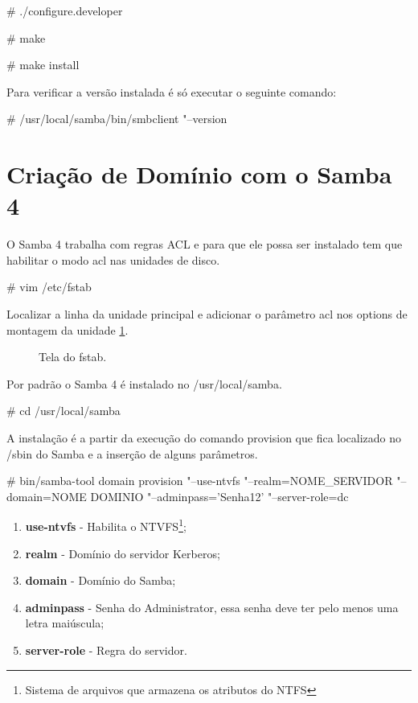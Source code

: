 \# ./configure.developer

\# make 

\# make install

Para verificar a versão instalada é só executar o seguinte comando:

\# /usr/local/samba/bin/smbclient "--version


\section{Criação de Domínio com o Samba 4}

O Samba 4 trabalha com regras ACL e para que ele possa ser instalado tem que habilitar o modo acl nas unidades de disco.

\# vim /etc/fstab

Localizar a linha da unidade principal e adicionar o parâmetro acl nos options de montagem da unidade \ref{fstab}.

\begin{figure}[ht]
   	\centering
   	\caption{Tela do fstab.}
    \label{fstab}
\end{figure}

Por padrão o Samba 4 é instalado no /usr/local/samba.

\# cd /usr/local/samba

A instalação é a partir da execução do comando provision que fica localizado no /sbin do Samba e a inserção de alguns parâmetros.

\noindent \# bin/samba-tool domain provision "--use-ntvfs "--realm=NOME\_SERVIDOR "--domain=NOME DOMINIO  "--adminpass='Senha12' "--server-role=dc

\begin{enumerate}
	\item \textbf{use-ntvfs} - Habilita o NTVFS\footnote[3]{Sistema de arquivos que armazena os atributos do NTFS};
	\item \textbf{realm} - Domínio do servidor Kerberos;
	\item \textbf{domain} - Domínio do Samba;
	\item \textbf{adminpass} - Senha do Administrator, essa senha deve ter pelo menos uma letra maiúscula;
	\item \textbf{server-role} - Regra do servidor.
\end{enumerate}

